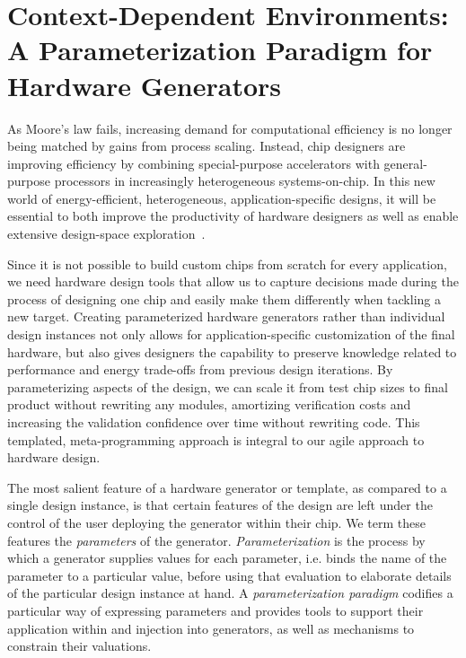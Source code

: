 \chapter{Context-Dependent Environments: \\ A Parameterization Paradigm for Hardware Generators}
\label{c.parameters}

As Moore's law fails, increasing demand for computational efficiency is no longer being matched by gains from process scaling. 
Instead, chip designers are improving efficiency by combining special-purpose accelerators with general-purpose processors in increasingly heterogeneous systems-on-chip.
In this new world of energy-efficient, heterogeneous, application-specific designs, it will be essential to both improve the productivity of hardware designers as well as enable extensive design-space exploration~\cite{shacham-micro10}.

Since it is not possible to build custom chips from scratch for every application,
we need hardware design tools that allow us to capture decisions made
during the process of designing one chip and easily make them differently when tackling a new target.
Creating parameterized hardware generators rather than individual design instances not only allows for application-specific customization of the final hardware,
but also gives designers the capability to preserve knowledge related to performance and energy trade-offs from previous design iterations.
By parameterizing aspects of the design, we can scale it from test chip sizes to final product without rewriting any modules, amortizing verification costs and increasing the validation confidence over time without rewriting code.
This templated, meta-programming approach is integral to our agile approach to hardware design.

The most salient feature of a hardware generator or template, as
compared to a single design instance, is that certain features of the design are
left under the control of the user deploying the generator within their chip.
We term these features the {\em parameters} of the generator.
{\em Parameterization} is the process by which a generator supplies values for each parameter,
i.e. binds the name of the parameter to a particular value,
before using that evaluation to elaborate details of the particular design instance at hand.
A {\em parameterization paradigm} codifies a particular way of expressing parameters and provides tools to support their application within and injection into generators,
as well as mechanisms to constrain their valuations.

